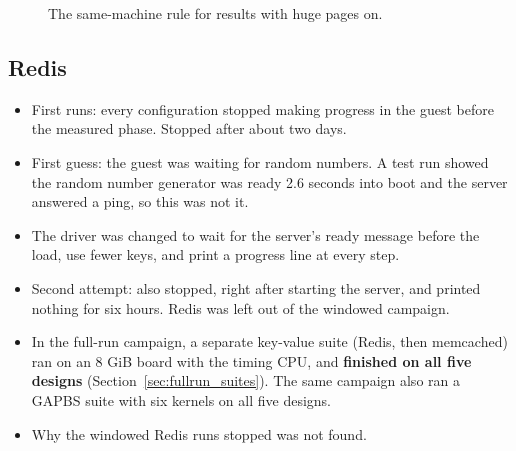 \begin{figure}[htbp]
\centering
{}
\caption{The same-machine rule for results with huge pages on.}
\label{fig:chr_samehost}
\end{figure}

\subsection{Redis}
\begin{itemize}
    \item First runs: every configuration stopped making progress in the guest before the measured phase. Stopped after about two days.
    \item First guess: the guest was waiting for random numbers. A test run showed the random number generator was ready 2.6 seconds into boot and the server answered a ping, so this was not it.
    \item The driver was changed to wait for the server's ready message before the load, use fewer keys, and print a progress line at every step.
    \item Second attempt: also stopped, right after starting the server, and printed nothing for six hours. Redis was left out of the windowed campaign.
    \item In the full-run campaign, a separate key-value suite (Redis, then memcached) ran on an 8 GiB board with the timing CPU, and \textbf{finished on all five designs} (Section~\ref{sec:fullrun_suites}). The same campaign also ran a GAPBS suite with six kernels on all five designs.
    \item Why the windowed Redis runs stopped was not found.
\end{itemize}

